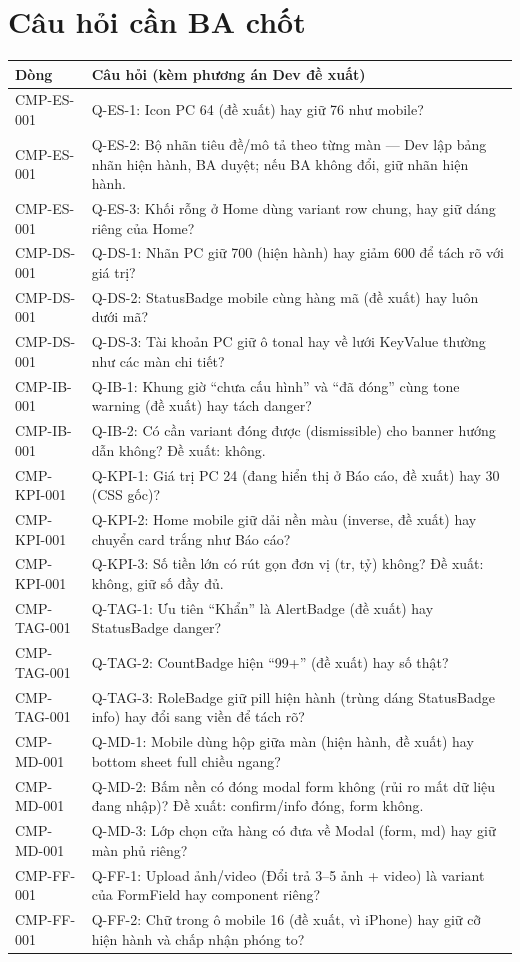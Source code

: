 \documentclass[11pt,a4paper]{report}
\begin{document}
\section*{Câu hỏi cần BA chốt}
\begin{longtable}{@{}p{}p{}@{}}\toprule
\textbf{Dòng} & \textbf{Câu hỏi (kèm phương án Dev đề xuất)}\\\midrule\endhead
CMP-ES-001 & Q-ES-1: Icon PC 64 (đề xuất) hay giữ 76 như mobile?\\
CMP-ES-001 & Q-ES-2: Bộ nhãn tiêu đề/\allowbreak{}mô tả theo từng màn — Dev lập bảng nhãn hiện hành, BA duyệt; nếu BA không đổi, giữ nhãn hiện hành.\\
CMP-ES-001 & Q-ES-3: Khối rỗng ở Home dùng variant row chung, hay giữ dáng riêng của Home?\\
CMP-DS-001 & Q-DS-1: Nhãn PC giữ 700 (hiện hành) hay giảm 600 để tách rõ với giá trị?\\
CMP-DS-001 & Q-DS-2: StatusBadge mobile cùng hàng mã (đề xuất) hay luôn dưới mã?\\
CMP-DS-001 & Q-DS-3: Tài khoản PC giữ ô tonal hay về lưới KeyValue thường như các màn chi tiết?\\
CMP-IB-001 & Q-IB-1: Khung giờ “chưa cấu hình” và “đã đóng” cùng tone warning (đề xuất) hay tách danger?\\
CMP-IB-001 & Q-IB-2: Có cần variant đóng được (dismissible) cho banner hướng dẫn không? Đề xuất: không.\\
CMP-KPI-001 & Q-KPI-1: Giá trị PC 24 (đang hiển thị ở Báo cáo, đề xuất) hay 30 (CSS gốc)?\\
CMP-KPI-001 & Q-KPI-2: Home mobile giữ dải nền màu (inverse, đề xuất) hay chuyển card trắng như Báo cáo?\\
CMP-KPI-001 & Q-KPI-3: Số tiền lớn có rút gọn đơn vị (tr, tỷ) không? Đề xuất: không, giữ số đầy đủ.\\
CMP-TAG-001 & Q-TAG-1: Ưu tiên “Khẩn” là AlertBadge (đề xuất) hay StatusBadge danger?\\
CMP-TAG-001 & Q-TAG-2: CountBadge hiện “99+” (đề xuất) hay số thật?\\
CMP-TAG-001 & Q-TAG-3: RoleBadge giữ pill hiện hành (trùng dáng StatusBadge info) hay đổi sang viền để tách rõ?\\
CMP-MD-001 & Q-MD-1: Mobile dùng hộp giữa màn (hiện hành, đề xuất) hay bottom sheet full chiều ngang?\\
CMP-MD-001 & Q-MD-2: Bấm nền có đóng modal form không (rủi ro mất dữ liệu đang nhập)? Đề xuất: confirm/\allowbreak{}info đóng, form không.\\
CMP-MD-001 & Q-MD-3: Lớp chọn cửa hàng có đưa về Modal (form, md) hay giữ màn phủ riêng?\\
CMP-FF-001 & Q-FF-1: Upload ảnh/\allowbreak{}video (Đổi trả 3–5 ảnh + video) là variant của FormField hay component riêng?\\
CMP-FF-001 & Q-FF-2: Chữ trong ô mobile 16 (đề xuất, vì iPhone) hay giữ cỡ hiện hành và chấp nhận phóng to?\\
\bottomrule\end{longtable}
\end{document}
